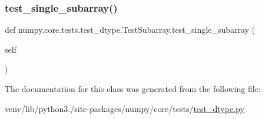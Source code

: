 \subsubsection{\texorpdfstring{test\+\_\+single\+\_\+subarray()}{test\_single\_subarray()}}
{\footnotesize\ttfamily def numpy.\+core.\+tests.\+test\+\_\+dtype.\+Test\+Subarray.\+test\+\_\+single\+\_\+subarray (\begin{DoxyParamCaption}\item[{}]{self }\end{DoxyParamCaption})}



The documentation for this class was generated from the following file\+:\begin{DoxyCompactItemize}
\item 
venv/lib/python3./site-\/packages/numpy/core/tests/\hyperlink{test__dtype_8py}{test\+\_\+dtype.\+py}\end{DoxyCompactItemize}

